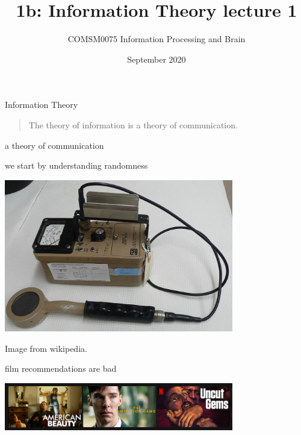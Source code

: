 \documentclass{beamer}
\title[1b Motivating Shannons Entropy: lecture 1]{1b: Information Theory lecture 1}
\author{COMSM0075 Information Processing and Brain}
\institute{\texttt{comsm0075.github.io}}
\date{September 2020}
\begin{document}
\maketitle


\begin{frame}{Information Theory}
\begin{quote}  
The theory of information is a theory of communication.
\end{quote}
\end{frame}


\begin{frame}{a theory of communication}
  \begin{center}
  \end{center}
\end{frame}


\begin{frame}{we start by understanding randomness}
\begin{center}  
  \begin{center}
    \includegraphics[width=10cm]{geiger_counter.jpg}
  \end{center}
\end{center}
  \vfill
\tiny{Image from wikipedia.}
\end{frame}



\begin{frame}{film  recommendations are bad}
 \begin{center}
    \includegraphics[width=10cm]{netflix_recommends.png}
 \end{center}
 \end{frame}
\end{document}
